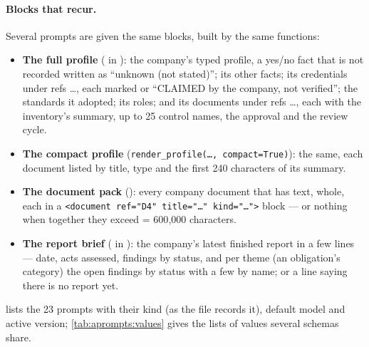 \paragraph{Blocks that recur.} Several prompts are given the same blocks, built by the same
functions:
\begin{itemize}[itemsep=1pt, topsep=3pt]
  \item \textbf{The full profile} ( in ): the
    company's typed profile, a yes/no fact that is not recorded written as \enquote{unknown
    (not stated)}; its other facts; its credentials under refs …, each marked
     or \enquote{CLAIMED by the company, not verified}; the standards it
    adopted; its roles; and its documents under refs …, each with the inventory's
    summary, up to 25 control names, the approval and the review cycle.
  \item \textbf{The compact profile} (\texttt{render\_profile(…, compact=True)}): the same, each
    document listed by title, type and the first 240 characters of its summary.
  \item \textbf{The document pack} (): every company document that has
    text, whole, each in a \texttt{<document ref="D4" title="…" kind="…">} block --- or nothing
    when together they exceed  = 600{,}000 characters.
  \item \textbf{The report brief} ( in ): the
    company's latest finished report in a few lines --- date, acts assessed, findings by
    status, and per theme (an obligation's category) the open findings by status with a few
    by name; or a line saying there is no report yet.
\end{itemize}

 lists the 23 prompts with their kind (as the file records it), default
model and active version; \cref{tab:aprompts:values} gives the lists of values several schemas
share.

